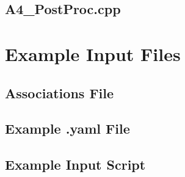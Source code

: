 \documentclass[a4paper, 12pt]{article}
\begin{document}
\subsection{A4\_PostProc.cpp} \label{subsec:PostProc.cpp}


\newpage
\section{Example Input Files}\label{sec:ExInput}

\subsection{Associations File} \label{subsec:ExAssoc}


\subsection{Example .yaml File} \label{subsec:ExYaml}


\subsection{Example Input Script} \label{subsec:ExIn}

\end{document}
